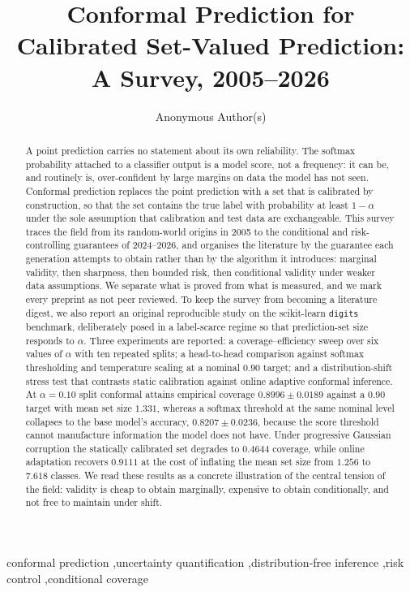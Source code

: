 \documentclass[a4paper,longmktitle]{cas-sc}
\title[mode = title]{Conformal Prediction for Calibrated Set-Valued Prediction: A Survey, 2005--2026}
\author[1]{Anonymous Author(s)}
\affiliation[1]{organization={Anonymous Author(s)},
                 country={}}
\begin{document}
\let\WriteBookmarks\relax
\def\floatpagepagefraction{.7}
\def\textpagefraction{.35}
\renewcommand{\topfraction}{.92}
\renewcommand{\bottomfraction}{.75}
\renewcommand{\textfraction}{.08}
\setcounter{topnumber}{3}
\setcounter{bottomnumber}{2}
\setcounter{totalnumber}{5}

\begin{abstract}
A point prediction carries no statement about its own reliability. The softmax probability attached to a classifier output is a model score, not a frequency: it can be, and routinely is, over-confident by large margins on data the model has not seen. Conformal prediction replaces the point prediction with a set that is calibrated by construction, so that the set contains the true label with probability at least $1-\alpha$ under the sole assumption that calibration and test data are exchangeable. This survey traces the field from its random-world origins in 2005 to the conditional and risk-controlling guarantees of 2024--2026, and organises the literature by the guarantee each generation attempts to obtain rather than by the algorithm it introduces: marginal validity, then sharpness, then bounded risk, then conditional validity under weaker data assumptions. We separate what is proved from what is measured, and we mark every preprint as not peer reviewed. To keep the survey from becoming a literature digest, we also report an original reproducible study on the scikit-learn \texttt{digits} benchmark, deliberately posed in a label-scarce regime so that prediction-set size responds to $\alpha$. Three experiments are reported: a coverage--efficiency sweep over six values of $\alpha$ with ten repeated splits; a head-to-head comparison against softmax thresholding and temperature scaling at a nominal $0.90$ target; and a distribution-shift stress test that contrasts static calibration against online adaptive conformal inference. At $\alpha=0.10$ split conformal attains empirical coverage $0.8996\pm0.0189$ against a $0.90$ target with mean set size $1.331$, whereas a softmax threshold at the same nominal level collapses to the base model's accuracy, $0.8207\pm0.0236$, because the score threshold cannot manufacture information the model does not have. Under progressive Gaussian corruption the statically calibrated set degrades to $0.4644$ coverage, while online adaptation recovers $0.9111$ at the cost of inflating the mean set size from $1.256$ to $7.618$ classes. We read these results as a concrete illustration of the central tension of the field: validity is cheap to obtain marginally, expensive to obtain conditionally, and not free to maintain under shift.
\end{abstract}
\begin{keywords}
conformal prediction \sep uncertainty quantification \sep distribution-free inference \sep risk control \sep conditional coverage
\end{keywords}
\end{document}
